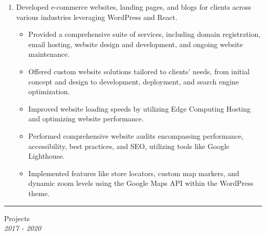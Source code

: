 \documentclass{article}
\begin{document}
\begin{enumerate}
    \item[] Developed e-commerce websites, landing pages, and blogs for clients across various industries leveraging WordPress and React.
   \begin{itemize}
    \item Provided a comprehensive suite of services, including domain registration, email hosting, website design and development, and ongoing website maintenance.
    \item Offered custom website solutions tailored to clients' needs, from initial concept and design to development, deployment, and search engine optimization.
    \item Improved website loading speeds  by utilizing Edge Computing Hosting and optimizing website performance.
    \item Performed comprehensive website audits encompassing performance, accessibility, best practices, and SEO, utilizing tools like Google Lighthouse.
    \item Implemented features like store locators, custom map markers, and dynamic zoom levels using the Google Maps API within the WordPress theme.
   \end{itemize}
\end{enumerate}



\vspace{1.4em}
\hrule 
\vspace{0.4em}
\hspace{-2.em}
{\bf}Projects  \hfill {} \\%
{\em } \hfill {\em 2017 - 2020 } %
\end{document}
